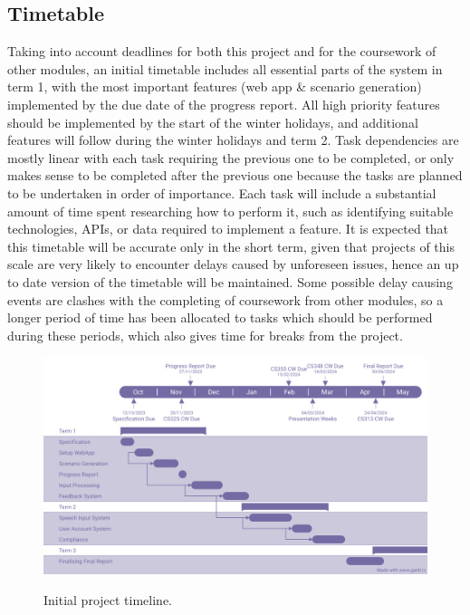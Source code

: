 \subsection{Timetable}
Taking into account deadlines for both this project and for the coursework of other modules, an initial timetable includes all essential parts of the system in term 1, with the most important features (web app \& scenario generation) implemented by the due date of the progress report. All high priority features should be implemented by the start of the winter holidays, and additional features will follow during the winter holidays and term 2. Task dependencies are mostly linear with each task requiring the previous one to be completed, or only makes sense to be completed after the previous one because the tasks are planned to be undertaken in order of importance. Each task will include a substantial amount of time spent researching how to perform it, such as identifying suitable technologies, APIs, or data required to implement a feature. It is expected that this timetable will be accurate only in the short term, given that projects of this scale are very likely to encounter delays caused by unforeseen issues, hence an up to date version of the timetable will be maintained. Some possible delay causing events are clashes with the completing of coursework from other modules, so a longer period of time has been allocated to tasks which should be performed during these periods, which also gives time for breaks from the project.

\begin{figure}[H]
    \centering
	\includegraphics[scale = 0.29]{../document-resources/images/initial-gantt.png}
    \label{initialgantt}
    \caption{Initial project timeline.}
\end{figure}

